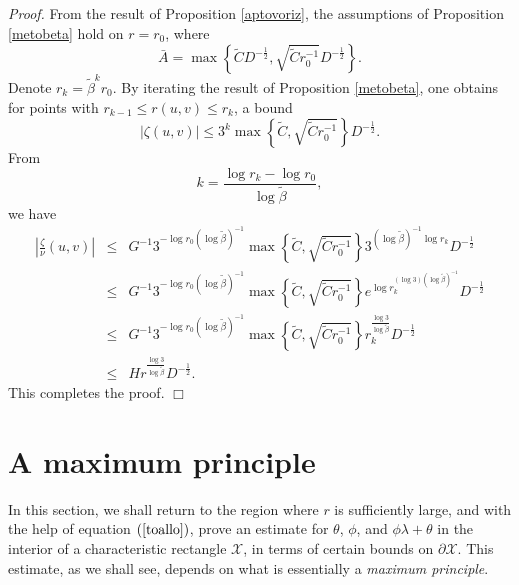 \documentclass{article}
\newcommand{\zn}{\frac{\zeta}{\nu}}
\begin{document}
\noindent\emph{Proof.} From the result of Proposition \ref{aptovoriz},
the assumptions of Proposition \ref{metobeta} hold on $r=r_0$,
where 
\[
\bar{A} =\max\left\{\tilde{C}D^{-\frac12},\sqrt{\tilde{C}r_0^{-1}}
D^{-\frac12}\right\}.
\] 
Denote $r_k=\tilde{\beta}^kr_0$.
By iterating the result of Proposition \ref{metobeta}, one obtains
for points with $r_{k-1}\le r(u,v)\le r_k$, a bound 
\[
|\zeta (u,v)|\le3^k\max\left\{\tilde{C},\sqrt{\tilde{C}r_0^{-1}}\right\}
D^{-\frac 12}.
\]
From
\[
k=\frac{\log r_k-\log r_0}{\log \tilde\beta},
\]
we have
\begin{eqnarray*}
\left|\zn(u,v)\right|	&\le&	G^{-1}3^{-\log r_0(\log\tilde{\beta})^{-1}}
					\max\left\{\tilde{C},\sqrt{\tilde{C}r_0^{-1}}\right\}3^{(\log\tilde\beta)^{-1}
					\log r_k}D^{-\frac 12}\\
			&\le&	G^{-1}3^{-\log r_0(\log\tilde{\beta})^{-1}}
					\max\left\{\tilde{C},\sqrt{\tilde{C}r_0^{-1}}\right\}
					e^{\log r_k^{(\log 3)(\log\tilde\beta)^{-1}}}
					D^{-\frac 12}\\
			&\le&	G^{-1}3^{-\log r_0(\log\tilde{\beta})^{-1}}
					\max\left\{\tilde{C},\sqrt{\tilde{C}r_0^{-1}}\right\}r_k^{\frac{\log 3}
					{\log\tilde\beta}}D^{-\frac 12}\\
			&\le&	Hr^{\frac{\log 3}
					{\log\tilde\beta}}D^{-\frac 12}.
\end{eqnarray*}
This completes the proof.
$\Box$




















\section{A maximum principle}
\label{maxsec}
In this section, we shall return to the region where $r$ is
sufficiently large, and with the help of equation $(\ref{toallo})$, 
prove an estimate for $\theta$, $\phi$, and $\phi\lambda+\theta$
in the interior of a characteristic rectangle $\mathcal{X}$, in terms
of certain bounds on $\partial{\mathcal{X}}$.
This estimate, as we shall see, depends on
what is essentially a \emph{maximum principle}.
\end{document}
